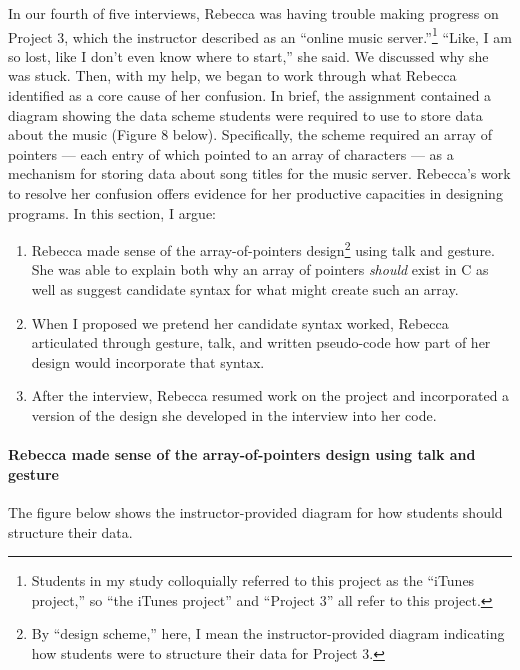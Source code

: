 In our fourth of five interviews, Rebecca was having trouble making
progress on Project 3, which the instructor described as an ``online
music server.''\footnote{Students in my study colloquially referred to
  this project as the ``iTunes project,'' so ``the iTunes project'' and
  ``Project 3'' all refer to this project.} ``Like, I am so lost, like I
don't even know where to start,'' she said. We discussed why she was
stuck. Then, with my help, we began to work through what Rebecca
identified as a core cause of her confusion. In brief, the assignment
contained a diagram showing the data scheme students were required to
use to store data about the music (Figure 8 below). Specifically, the
scheme required an array of pointers --- each entry of which pointed to
an array of characters --- as a mechanism for storing data about song
titles for the music server. Rebecca's work to resolve her confusion
offers evidence for her productive capacities in designing programs. In
this section, I argue:

\begin{enumerate}
\def\labelenumi{\arabic{enumi}.}
\item
  Rebecca made sense of the array-of-pointers design\footnote{By
    ``design scheme,'' here, I mean the instructor-provided diagram
    indicating how students were to structure their data for Project 3.}
  using talk and gesture. She was able to explain both why an array of
  pointers \emph{should} exist in C as well as suggest candidate syntax
  for what might create such an array.
\item
  When I proposed we pretend her candidate syntax worked, Rebecca
  articulated through gesture, talk, and written pseudo-code how part of
  her design would incorporate that syntax.
\item
  After the interview, Rebecca resumed work on the project and
  incorporated a version of the design she developed in the interview
  into her code.
\end{enumerate}

\paragraph{Rebecca made sense of the array-of-pointers design using talk
and
gesture}\label{rebecca-made-sense-of-the-array-of-pointers-design-using-talk-and-gesture}

The figure below shows the instructor-provided diagram for how students
should structure their data.

